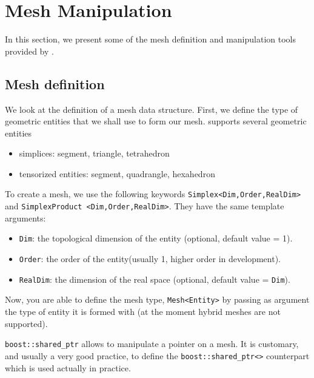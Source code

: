 \section{Mesh Manipulation}
\label{sec:mesh-manipulation}


In this section, we present some of the mesh definition and
manipulation tools provided by \feel.

\subsection{Mesh definition}

We look at the definition of a mesh data structure. First, we define
the type of geometric entities that we shall use to form our mesh. \feel supports several geometric entities
\begin{itemize}
\item simplices: segment, triangle, tetrahedron
\item tensorized entities: segment, quadrangle, hexahedron
\end{itemize}

To create a mesh, we use the following keywords \lstinline!Simplex<Dim,Order,RealDim>!  and \newline
\lstinline!SimplexProduct <Dim,Order,RealDim>!. They have the same
template arguments:
\begin{itemize}
\item \lstinline!Dim!: the topological dimension of the entity (optional, default value = 1).
\item \lstinline!Order!: the order of the entity(usually 1, higher order in development).
\item \lstinline!RealDim!: the dimension of the real space (optional, default value = \lstinline!Dim!).
\end{itemize}




Now, you are able to define the mesh type, \lstinline!Mesh<Entity>! by passing as
argument the type of entity it is formed with (at the moment hybrid
meshes are not supported).



\lstinline!boost::shared_ptr! allows to manipulate a pointer on a mesh. It is customary, and usually a very good practice, to define the
\lstinline!boost::shared_ptr<>!  counterpart which is used actually in practice.

